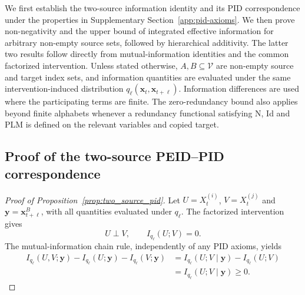 {\color{red}
We first establish the two-source information identity and its PID correspondence under the properties in Supplementary Section~\ref{app:pid-axioms}. We then prove non-negativity and the upper bound of integrated effective information for arbitrary non-empty source sets, followed by hierarchical additivity. The latter two results follow directly from mutual-information identities and the common factorized intervention. Unless stated otherwise, $A,B\subseteq\mathcal{V}$ are non-empty source and target index sets, and information quantities are evaluated under the same intervention-induced distribution $q_\ell(\boldsymbol{x}_t,\boldsymbol{x}_{t+\ell})$. Information differences are used where the participating terms are finite. The zero-redundancy bound also applies beyond finite alphabets whenever a redundancy functional satisfying N, Id and PLM is defined on the relevant variables and copied target.

\subsection{Proof of the two-source PEID--PID correspondence}
\label{app:proof_two_source_pid}
\begin{proof}[Proof of Proposition~\ref{prop:two_source_pid}]
Let $U=X_t^{(i)}$, $V=X_t^{(j)}$ and $\boldsymbol{y}=\boldsymbol{x}_{t+\ell}^{B}$, with all quantities evaluated under $q_\ell$. The factorized intervention gives
\begin{equation}
U\perp V,\qquad I_{q_\ell}(U;V)=0.
\label{eq:supp_source_independence}
\end{equation}
The mutual-information chain rule, independently of any PID axioms, yields
\begin{align}
I_{q_\ell}(U,V;\boldsymbol{y})-I_{q_\ell}(U;\boldsymbol{y})-I_{q_\ell}(V;\boldsymbol{y})
&=I_{q_\ell}(U;V\mid\boldsymbol{y})-I_{q_\ell}(U;V)\nonumber\\
&=I_{q_\ell}(U;V\mid\boldsymbol{y})\geq0.
\label{eq:supp_two_source_cmi_identity}
\end{align}


\end{proof}}
